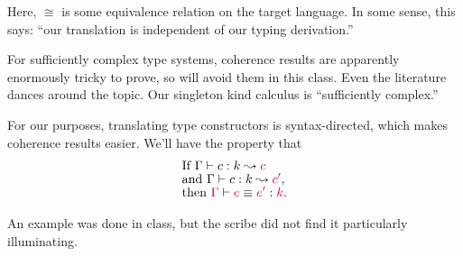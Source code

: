 \documentclass{amsart}
\newcommand{\target}[1]{{\color{purple}#1}}
\begin{document}
Here, $\cong$ is some equivalence relation on the target language. In some
sense, this says: ``our translation is independent of our typing derivation.''

For sufficiently complex type systems, coherence results are apparently
enormously tricky to prove, so will avoid them in this class. Even the
literature dances around the topic. Our singleton kind calculus is
``sufficiently complex.''

For our purposes, translating type constructors is syntax-directed, which makes
coherence results easier. We'll have the property that
\begin{align*}
&\text{If }\Gamma \vdash c : k \leadsto \target{c} \\[-1ex]
&\text{and }\Gamma \vdash c : k \leadsto \target{c'}, \\[-1ex]
&\text{then }\target{\Gamma} \vdash \target{e} \equiv \target{e'} : \target{k}.
\end{align*}

An example was done in class, but the scribe did not find it particularly
illuminating.
\end{document}
